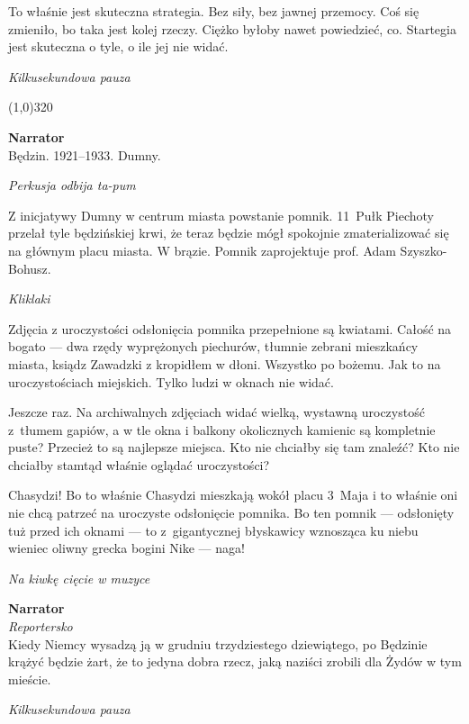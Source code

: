 \documentclass[11pt,a4paper,oneside]{article}
\begin{document}
To właśnie jest skuteczna strategia. Bez siły, bez jawnej przemocy.
Coś się zmieniło, bo taka jest kolej rzeczy.  Ciężko byłoby nawet
powiedzieć, co. Startegia jest skuteczna o tyle, o ile jej nie widać. 

{\color{light-gray} \emph{Kilkusekundowa pauza}}

\line(1,0){320}


\textbf{Narrator}\\
Będzin. 1921--1933. Dumny.

{\color{light-gray} \emph{Perkusja odbija ta-pum}}

Z inicjatywy Dumny  w centrum miasta powstanie pomnik.
11~Pułk Piechoty przelał tyle będzińskiej krwi, że teraz będzie mógł
spokojnie zmaterializować się na głównym placu miasta. W brązie.
Pomnik zaprojektuje prof. Adam Szyszko-Bohusz.

{\color{light-gray} \emph{Kliklaki}}

Zdjęcia z uroczystości odsłonięcia pomnika przepełnione są kwiatami.
Całość na bogato --- dwa rzędy wyprężonych piechurów, tłumnie zebrani
mieszkańcy miasta, ksiądz Zawadzki z kropidłem w dłoni.  Wszystko po
bożemu.  Jak to na uroczystościach miejskich.  Tylko ludzi w oknach
nie widać.

Jeszcze raz. Na archiwalnych zdjęciach widać wielką, wystawną
uroczystość z~tłumem gapiów, a w tle okna i balkony okolicznych
kamienic są kompletnie puste?  Przecież to są najlepsze miejsca. Kto
nie chciałby się tam znaleźć?  Kto nie chciałby stamtąd właśnie
oglądać uroczystości?

Chasydzi! Bo to właśnie Chasydzi mieszkają wokół placu 3~Maja i to
właśnie oni nie chcą patrzeć na uroczyste odsłonięcie pomnika. Bo ten
pomnik --- odsłonięty tuż przed ich oknami --- to z~gigantycznej błyskawicy
wznosząca ku niebu wieniec oliwny grecka bogini Nike --- naga!

{\color{light-gray} \emph{Na kiwkę cięcie w muzyce}}

\textbf{Narrator}\\
{\color{light-gray} \emph{Reportersko}}\\
Kiedy Niemcy wysadzą ją w grudniu trzydziestego dziewiątego, po
Będzinie krążyć będzie żart, że to jedyna dobra rzecz, jaką naziści
zrobili dla Żydów w tym mieście.

{\color{light-gray} \emph{Kilkusekundowa pauza}}
\end{document}

